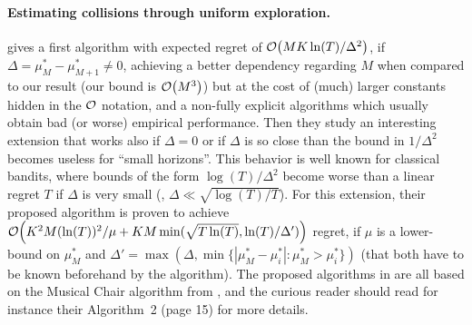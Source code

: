 \paragraph{Estimating collisions through uniform exploration.}
%
\cite{LugosiMehrabian18} gives a first algorithm with expected regret of $\mathop{}\mathopen{}\mathcal{O}\mathopen{}\left(M K \ln(T) / \Delta^2\right)$, if $\Delta = \mu^*_{M} - \mu^*_{M+1} \neq 0$, achieving a better dependency regarding $M$ when compared to our result (our bound is $\mathop{}\mathopen{}\mathcal{O}\mathopen{}\left(M^3\right)$) but at the cost of (much) larger constants hidden in the $\mathcal{O}$ notation, and a non-fully explicit algorithms which usually obtain bad (or worse) empirical performance.
Then they study an interesting extension that works also if $\Delta = 0$ or if $\Delta$ is so close than the bound in $1/\Delta^2$ becomes useless for ``small horizons''. This behavior is well known for classical bandits, where bounds of the form $\log(T)/\Delta^2$ become worse than a linear regret $T$ if $\Delta$ is very small (\ie, $\Delta\ll \sqrt{\log(T)/T}$).
For this extension, their proposed algorithm is proven to achieve $\mathop{}\mathopen{}\mathcal{O}\mathopen{}\left(K^2 M (\ln(T))^2 / \mu + K M \min(\sqrt{T \ln(T)}, \ln(T)/\Delta')\right)$ regret, if $\mu$ is a lower-bound on $\mu^*_{M}$ and $\Delta' = \max(\Delta, \min\{|\mu^*_M-\mu^*_i| : \mu^*_M > \mu^*_i \})$ (that both have to be known beforehand by the algorithm).
%
The proposed algorithms in \cite{LugosiMehrabian18} are all based on the Musical Chair algorithm from \cite{Rosenski16}, and the curious reader should read for instance their Algorithm~2 (page 15) for more details.

